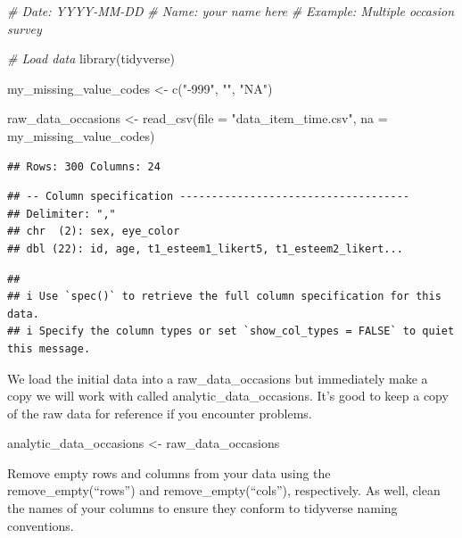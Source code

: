 \documentclass[
]{krantz}
\makeatletter
\newenvironment{Shaded}{\begin{snugshade}}{\end{snugshade}}
\newcommand{\AttributeTok}[1]{\textcolor[rgb]{0.61,0.61,0.61}{#1}}
\newcommand{\CommentTok}[1]{\textcolor[rgb]{0.37,0.37,0.37}{\textit{#1}}}
\newcommand{\FunctionTok}[1]{\textcolor[rgb]{0,0,0}{#1}}
\newcommand{\NormalTok}[1]{#1}
\newcommand{\OtherTok}[1]{\textcolor[rgb]{0.37,0.37,0.37}{#1}}
\newcommand{\StringTok}[1]{\textcolor[rgb]{0.5,0.5,0.5}{#1}}
\newenvironment{kframe}{%
\medskip{}
\setlength{\fboxsep}{.8em}
 \def\at@end@of@kframe{}%
 \ifinner\ifhmode%
  \def\at@end@of@kframe{\end{minipage}}%
  \begin{minipage}{\columnwidth}%
 \fi\fi%
 \def\FrameCommand##1{\hskip\@totalleftmargin \hskip-\fboxsep
 \colorbox{shadecolor}{##1}\hskip-\fboxsep
     \hskip-\linewidth \hskip-\@totalleftmargin \hskip\columnwidth}%
 \MakeFramed {\advance\hsize-\width
   \@totalleftmargin\z@ \linewidth\hsize
   \@setminipage}}%
 {\par\unskip\endMakeFramed%
 \at@end@of@kframe}
\renewenvironment{Shaded}{\begin{kframe}}{\end{kframe}}
\makeatother
\begin{document}
\begin{Shaded}
\begin{Highlighting}[]
\CommentTok{\# Date: YYYY{-}MM{-}DD}
\CommentTok{\# Name: your name here}
\CommentTok{\# Example: Multiple occasion survey}

\CommentTok{\# Load data}
\FunctionTok{library}\NormalTok{(tidyverse)}

\NormalTok{my\_missing\_value\_codes }\OtherTok{\textless{}{-}} \FunctionTok{c}\NormalTok{(}\StringTok{"{-}999"}\NormalTok{, }\StringTok{""}\NormalTok{, }\StringTok{"NA"}\NormalTok{)}

\NormalTok{raw\_data\_occasions }\OtherTok{\textless{}{-}} \FunctionTok{read\_csv}\NormalTok{(}\AttributeTok{file =} \StringTok{"data\_item\_time.csv"}\NormalTok{,}
                               \AttributeTok{na =}\NormalTok{ my\_missing\_value\_codes)}
\end{Highlighting}
\end{Shaded}

\begin{verbatim}
## Rows: 300 Columns: 24
\end{verbatim}

\begin{verbatim}
## -- Column specification ------------------------------------
## Delimiter: ","
## chr  (2): sex, eye_color
## dbl (22): id, age, t1_esteem1_likert5, t1_esteem2_likert...
\end{verbatim}

\begin{verbatim}
## 
## i Use `spec()` to retrieve the full column specification for this data.
## i Specify the column types or set `show_col_types = FALSE` to quiet this message.
\end{verbatim}

We load the initial data into a raw\_data\_occasions but immediately make a copy we will work with called analytic\_data\_occasions. It's good to keep a copy of the raw data for reference if you encounter problems.

\begin{Shaded}
\begin{Highlighting}[]
\NormalTok{analytic\_data\_occasions }\OtherTok{\textless{}{-}}\NormalTok{ raw\_data\_occasions}
\end{Highlighting}
\end{Shaded}

Remove empty rows and columns from your data using the remove\_empty(``rows'') and remove\_empty(``cols''), respectively. As well, clean the names of your columns to ensure they conform to tidyverse naming conventions.
\end{document}
